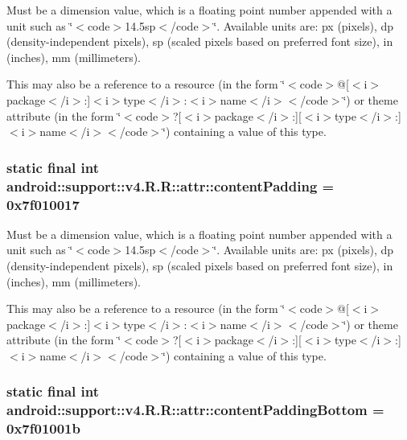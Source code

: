 Must be a dimension value, which is a floating point number appended with a unit such as \char`\"{}$<$code$>$14.5sp$<$/code$>$\char`\"{}. Available units are: px (pixels), dp (density-independent pixels), sp (scaled pixels based on preferred font size), in (inches), mm (millimeters). 

This may also be a reference to a resource (in the form \char`\"{}$<$code$>$@\mbox{[}$<$i$>$package$<$/i$>$:\mbox{]}$<$i$>$type$<$/i$>$:$<$i$>$name$<$/i$>$$<$/code$>$\char`\"{}) or theme attribute (in the form \char`\"{}$<$code$>$?\mbox{[}$<$i$>$package$<$/i$>$:\mbox{]}\mbox{[}$<$i$>$type$<$/i$>$:\mbox{]}$<$i$>$name$<$/i$>$$<$/code$>$\char`\"{}) containing a value of this type. \hypertarget{classandroid_1_1support_1_1v4_1_1_r_1_1attr_0386ad84d0049c7f7e8fcbc4a46486ef}{
\subsubsection[{contentPadding}]{\setlength{\rightskip}{0pt plus 5cm}static final int android::support::v4.R.R::attr::contentPadding = 0x7f010017}}
\label{classandroid_1_1support_1_1v4_1_1_r_1_1attr_0386ad84d0049c7f7e8fcbc4a46486ef}


Must be a dimension value, which is a floating point number appended with a unit such as \char`\"{}$<$code$>$14.5sp$<$/code$>$\char`\"{}. Available units are: px (pixels), dp (density-independent pixels), sp (scaled pixels based on preferred font size), in (inches), mm (millimeters). 

This may also be a reference to a resource (in the form \char`\"{}$<$code$>$@\mbox{[}$<$i$>$package$<$/i$>$:\mbox{]}$<$i$>$type$<$/i$>$:$<$i$>$name$<$/i$>$$<$/code$>$\char`\"{}) or theme attribute (in the form \char`\"{}$<$code$>$?\mbox{[}$<$i$>$package$<$/i$>$:\mbox{]}\mbox{[}$<$i$>$type$<$/i$>$:\mbox{]}$<$i$>$name$<$/i$>$$<$/code$>$\char`\"{}) containing a value of this type. \hypertarget{classandroid_1_1support_1_1v4_1_1_r_1_1attr_92d2c588fa7865789b27b48d88ab8e41}{
\subsubsection[{contentPaddingBottom}]{\setlength{\rightskip}{0pt plus 5cm}static final int android::support::v4.R.R::attr::contentPaddingBottom = 0x7f01001b}}
\label{classandroid_1_1support_1_1v4_1_1_r_1_1attr_92d2c588fa7865789b27b48d88ab8e41}


